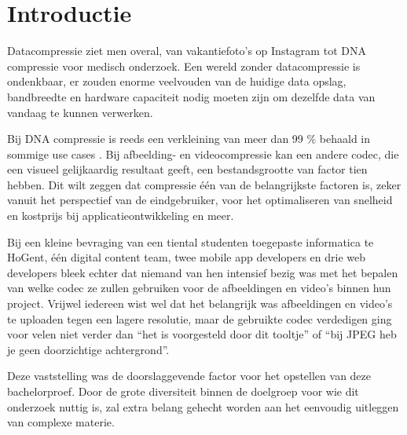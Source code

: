 
\section{Introductie} %
\label{sec:introductie}

Datacompressie ziet men overal, van vakantiefoto's op Instagram tot DNA compressie voor medisch onderzoek. Een wereld zonder datacompressie is ondenkbaar, er zouden enorme veelvouden van de huidige data opslag, bandbreedte en hardware capaciteit nodig moeten zijn om dezelfde data van vandaag te kunnen verwerken.

Bij DNA compressie is reeds een verkleining van meer dan 99 \% behaald in sommige use cases \autocite{Afify2011}. Bij afbeelding- en videocompressie kan een andere codec, die een visueel gelijkaardig resultaat geeft, een bestandsgrootte van factor tien hebben. Dit wilt zeggen dat compressie één van de belangrijkste factoren is, zeker vanuit het perspectief van de eindgebruiker, voor het optimaliseren van snelheid en kostprijs bij applicatieontwikkeling en meer.

Bij een kleine bevraging van een tiental studenten toegepaste informatica te HoGent, één digital content team, twee mobile app developers en drie web developers bleek echter dat niemand van hen intensief bezig was met het bepalen van welke codec ze zullen gebruiken voor de afbeeldingen en video’s binnen hun project. Vrijwel iedereen wist wel dat het belangrijk was afbeeldingen en video’s te uploaden tegen een lagere resolutie, maar de gebruikte codec verdedigen ging voor velen niet verder dan “het is voorgesteld door dit tooltje” of “bij JPEG heb je geen doorzichtige achtergrond”. 

Deze vaststelling was de doorslaggevende factor voor het opstellen van deze bachelorproef. Door de grote diversiteit binnen de doelgroep voor wie dit onderzoek nuttig is, zal extra belang gehecht worden aan het eenvoudig uitleggen van complexe materie.

